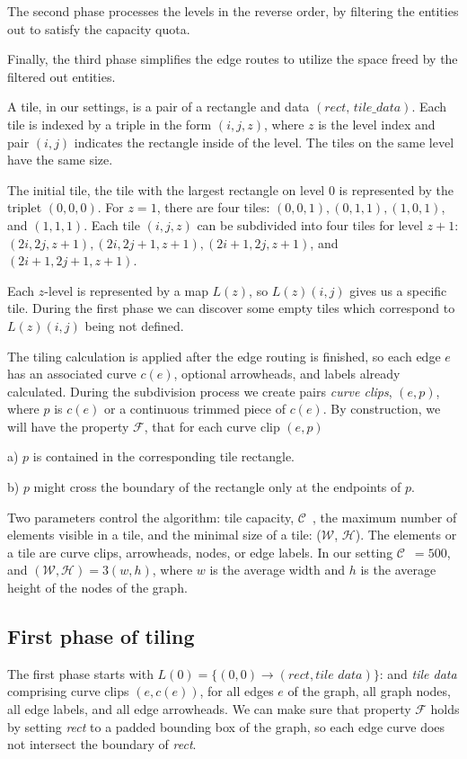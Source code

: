 \documentclass{gd-llncs}
\newcommand{\capac}{$\mathcal{C}$}
\newcommand{\mw}{$\mathcal{W}$}
\newcommand{\mh}{$\mathcal{H}$}
\begin{document}
{The second phase processes the levels in the reverse order, by filtering the entities out to satisfy the capacity quota. 

Finally, the third phase simplifies the edge routes to utilize the space freed by the filtered out entities.


A tile, in our settings, is a pair of a rectangle and data $(\textit{rect, tile\_data})$. Each tile is indexed by a triple in the form $(i,j,z)$, where $z$ is the level index and pair $(i,j)$ indicates the rectangle inside of the level. 
The tiles on the same level have the same size.

The initial tile, the tile with the largest rectangle on level $0$ is represented by the triplet $(0,0,0)$. For $z = 1$, there are four tiles: $(0,0,1),(0,1,1),(1,0,1)$, and $(1,1,1)$. Each tile $(i,j,z)$ can be subdivided into four tiles for level $z+1$: $(2i,2j,z+1),(2i,2j+1,z+1), (2i+1,2j,z+1)$, and $(2i+1,2j+1,z+1)$.

Each $z$-level is represented by a map $L(z)$, so $L(z)(i, j)$ gives us a specific tile. During the first phase we can discover some empty tiles which correspond to $L(z)(i, j)$ being not defined.

The tiling calculation is applied after the edge routing is finished, so each edge $e$ has an associated curve $c(e)$, optional arrowheads, and labels already calculated. During the subdivision process we create pairs \textit{curve clips}, $(e, p)$, where $p$ is $c(e)$ or a continuous trimmed piece of $c(e)$. By construction, we will have the property $\mathcal{F}$, that for each curve clip $(e,p)$ 

a) $p$ is contained in the corresponding tile rectangle. 

b) $p$ might cross the boundary of the rectangle only at the endpoints of $p$.

Two parameters control the algorithm: tile capacity, \capac~, the maximum number of elements visible in a tile, and the minimal size of a tile: (\mw, \mh). The elements or a tile are curve clips, arrowheads, nodes, or edge labels. In our setting \capac~$=500$, and $(\mathcal{W},\mathcal{H}) = 3(w,h)$, where $w$ is the average width and $h$ is the average height of the nodes of the graph.

\subsection*{First phase of tiling}
The first phase starts with $L(0) = \{(0,0) \rightarrow (\textit{rect},\textit{tile data})\}$: and \textit{tile data} comprising curve clips $(e,c(e))$, for all edges $e$ of the graph, all graph nodes, all edge labels, and all edge arrowheads. We can make sure that property $\mathcal{F}$ holds by setting \textit{rect} to a padded bounding box of the graph, so each edge curve does not intersect the boundary of \textit{rect}.

}
\end{document}
